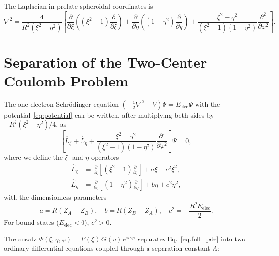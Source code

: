 \documentclass[aps,pra,twocolumn,superscriptaddress,longbibliography]{revtex4-2}
\begin{document}
The Laplacian in prolate spheroidal coordinates is
\begin{equation}
  \nabla^2 = \frac{4}{R^2(\xi^2 - \eta^2)}
  \left[
    \frac{\partial}{\partial\xi}\!\left((\xi^2\!-\!1)\frac{\partial}{\partial\xi}\right)
    + \frac{\partial}{\partial\eta}\!\left((1\!-\!\eta^2)\frac{\partial}{\partial\eta}\right)
    + \frac{\xi^2\!-\!\eta^2}{(\xi^2\!-\!1)(1\!-\!\eta^2)}\frac{\partial^2}{\partial\varphi^2}
  \right].
  \label{eq:laplacian}
\end{equation}


\section{Separation of the Two-Center Coulomb Problem}
\label{sec:separation}

The one-electron Schr\"odinger equation
$(-\tfrac{1}{2}\nabla^2 + V)\Psi = E_{\mathrm{elec}}\Psi$
with the potential~\eqref{eq:potential} can be written, after
multiplying both sides by $-R^2(\xi^2 - \eta^2)/4$, as
\begin{equation}
  \left[\hat{L}_\xi + \hat{L}_\eta
    + \frac{\xi^2 - \eta^2}{(\xi^2-1)(1-\eta^2)}
      \frac{\partial^2}{\partial\varphi^2}\right]\Psi
  = 0,
  \label{eq:full_pde}
\end{equation}
where we define the $\xi$- and $\eta$-operators
\begin{align}
  \hat{L}_\xi &= \frac{\partial}{\partial\xi}
    \!\left[(\xi^2 - 1)\frac{\partial}{\partial\xi}\right]
    + a\xi - c^2\xi^2, \label{eq:L_xi} \\
  \hat{L}_\eta &= \frac{\partial}{\partial\eta}
    \!\left[(1 - \eta^2)\frac{\partial}{\partial\eta}\right]
    + b\eta + c^2\eta^2, \label{eq:L_eta}
\end{align}
with the dimensionless parameters
\begin{equation}
  a = R(Z_A + Z_B), \quad
  b = R(Z_B - Z_A), \quad
  c^2 = -\frac{R^2 E_{\mathrm{elec}}}{2}.
  \label{eq:params}
\end{equation}
For bound states ($E_{\mathrm{elec}} < 0$), $c^2 > 0$.

The ansatz $\Psi(\xi,\eta,\varphi) = F(\xi)\,G(\eta)\,e^{im\varphi}$
separates Eq.~\eqref{eq:full_pde} into two ordinary differential
equations coupled through a separation constant $A$:
\end{document}
